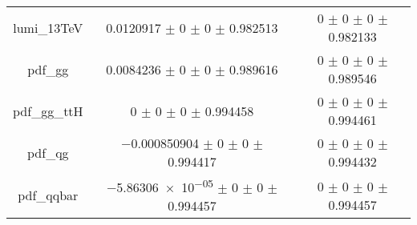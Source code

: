 \begin{table}
\begin{tabular}{ccc}
lumi\_13TeV & \num{0.0120917} $\pm$ \num{0} $\pm$ \num{0} $\pm$ \num{0.982513} & \num{0} $\pm$ \num{0} $\pm$ \num{0} $\pm$ \num{0.982133}\\
pdf\_gg & \num{0.0084236} $\pm$ \num{0} $\pm$ \num{0} $\pm$ \num{0.989616} & \num{0} $\pm$ \num{0} $\pm$ \num{0} $\pm$ \num{0.989546}\\
pdf\_gg\_ttH & \num{0} $\pm$ \num{0} $\pm$ \num{0} $\pm$ \num{0.994458} & \num{0} $\pm$ \num{0} $\pm$ \num{0} $\pm$ \num{0.994461}\\
pdf\_qg & \num{-0.000850904} $\pm$ \num{0} $\pm$ \num{0} $\pm$ \num{0.994417} & \num{0} $\pm$ \num{0} $\pm$ \num{0} $\pm$ \num{0.994432}\\
pdf\_qqbar & \num{-5.86306e-05} $\pm$ \num{0} $\pm$ \num{0} $\pm$ \num{0.994457} & \num{0} $\pm$ \num{0} $\pm$ \num{0} $\pm$ \num{0.994457}\\
\bottomrule
\end{tabular}
\end{table}